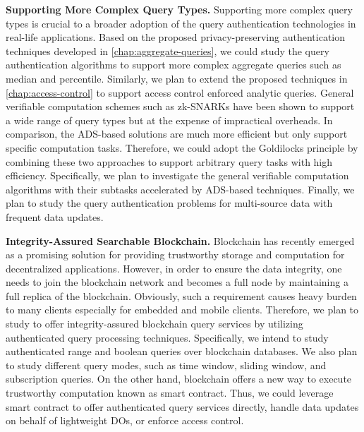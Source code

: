 \textbf{Supporting More Complex Query Types.}
Supporting more complex query types is crucial to a broader adoption of the query authentication technologies in real-life applications.
Based on the proposed privacy-preserving authentication techniques developed in \cref{chap:aggregate-queries}, we could study the query authentication algorithms to support more complex aggregate queries such as median and percentile. Similarly, we plan to extend the proposed techniques in \cref{chap:access-control} to support access control enforced analytic queries. General verifiable computation schemes such as zk-SNARKs have been shown to support a wide range of query types but at the expense of impractical overheads. In comparison, the ADS-based solutions are much more efficient but only support specific computation tasks. Therefore, we could adopt the Goldilocks principle by combining these two approaches to support arbitrary query tasks with high efficiency. Specifically, we plan to investigate the general verifiable computation algorithms with their subtasks accelerated by ADS-based techniques. Finally, we plan to study the query authentication problems for multi-source data with frequent data updates.

\textbf{Integrity-Assured Searchable Blockchain.}
Blockchain has recently emerged as a promising solution for providing trustworthy storage and computation for decentralized applications. However, in order to ensure the data integrity, one needs to join the blockchain network and becomes a full node by maintaining a full replica of the blockchain. Obviously, such a requirement causes heavy burden to many clients especially for embedded and mobile clients. Therefore, we plan to study to offer integrity-assured blockchain query services by utilizing authenticated query processing techniques. Specifically, we intend to study authenticated range and boolean queries over blockchain databases. We also plan to study different query modes, such as time window, sliding window, and subscription queries. On the other hand, blockchain offers a new way to execute trustworthy computation known as smart contract. Thus, we could leverage smart contract to offer authenticated query services directly, handle data updates on behalf of lightweight DOs, or enforce access control.

